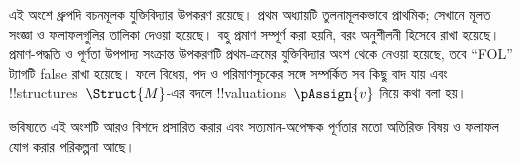 \documentclass[../../include/open-logic-part]{subfiles}
\begin{document}

\begin{editorial}
  এই অংশে ধ্রুপদি বচনমূলক যুক্তিবিদ্যার উপকরণ রয়েছে। প্রথম অধ্যায়টি
  তুলনামূলকভাবে প্রাথমিক; সেখানে মূলত সংজ্ঞা ও ফলাফলগুলির তালিকা দেওয়া
  হয়েছে। বহু প্রমাণ সম্পূর্ণ করা হয়নি, বরং অনুশীলনী হিসেবে রাখা হয়েছে।
  প্রমাণ-পদ্ধতি ও পূর্ণতা উপপাদ্য সংক্রান্ত উপকরণটি প্রথম-ক্রমের যুক্তিবিদ্যার
  অংশ থেকে নেওয়া হয়েছে, তবে “FOL” ট্যাগটি false রাখা হয়েছে। ফলে
  বিধেয়, পদ ও পরিমাণসূচকের সঙ্গে সম্পর্কিত সব কিছু বাদ যায় এবং
  !!{structure}s~$\Struct{M}$-এর বদলে
  !!{valuation}s~$\pAssign{v}$ নিয়ে কথা বলা হয়।

  ভবিষ্যতে এই অংশটি আরও বিশদে প্রসারিত করার এবং
  সত্যমান-অপেক্ষক পূর্ণতার মতো অতিরিক্ত বিষয় ও ফলাফল যোগ করার পরিকল্পনা আছে।
\end{editorial}










\OLEndPartHook
\end{document}
